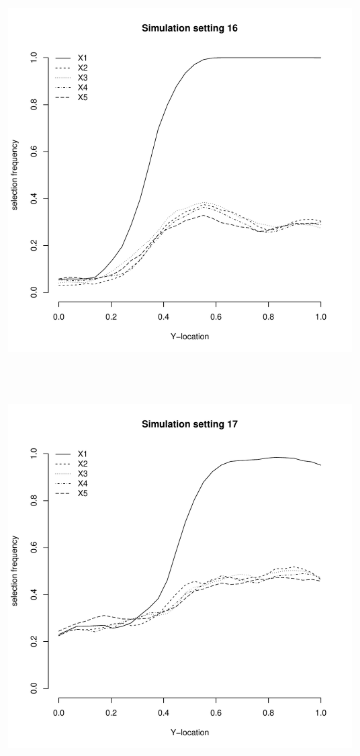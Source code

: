 \documentclass[authoryear, review, 11pt]{elsarticle}
\begin{document}
	
	\begin{figure}
		\centering
		\begin{subfigure}[b]{0.3\textwidth}
			\centering
			\includegraphics[width=\textwidth]{../../figures/simulation/28-16-profile-selection.pdf}
			\label{fig:gull}
		\end{subfigure}%
        ~ %
		\begin{subfigure}[b]{0.3\textwidth}
			\centering
			\includegraphics[width=\textwidth]{../../figures/simulation/28-17-profile-selection.pdf}

\end{subfigure}
\end{figure}
\end{document}
